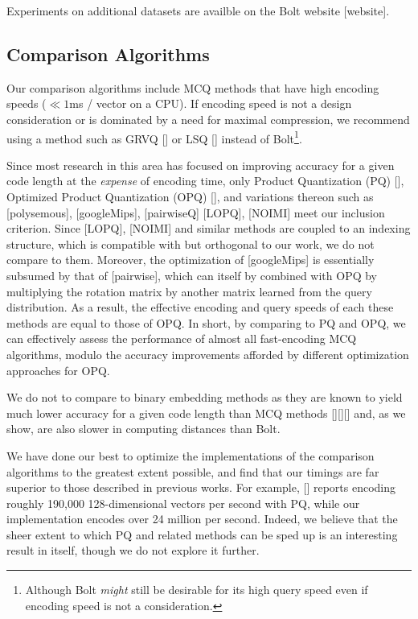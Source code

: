 Experiments on additional datasets are availble on the Bolt website [website].

\subsection{Comparison Algorithms}

Our comparison algorithms include MCQ methods that have high encoding speeds ($\ll 1$ms / vector on a CPU). If encoding speed is not a design consideration or is dominated by a need for maximal compression, we recommend using a method such as GRVQ [] or LSQ [] instead of Bolt\footnote{Although Bolt \textit{might} still be desirable for its high query speed even if encoding speed is not a consideration.}.

Since most research in this area has focused on improving accuracy for a given code length at the \textit{expense} of encoding time, only Product Quantization (PQ) [], Optimized Product Quantization (OPQ) [], and variations thereon such as [polysemous], [googleMips], [pairwiseQ] [LOPQ], [NOIMI] meet our inclusion criterion. Since [LOPQ], [NOIMI] and similar methods are coupled to an indexing structure, which is compatible with but orthogonal to our work, we do not compare to them. Moreover, the optimization of [googleMips] is essentially subsumed by that of [pairwise], which can itself by combined with OPQ by multiplying the rotation matrix by another matrix learned from the query distribution. As a result, the effective encoding and query speeds of each these methods are equal to those of OPQ. In short, by comparing to PQ and OPQ, we can effectively assess the performance of almost all fast-encoding MCQ algorithms, modulo the accuracy improvements afforded by different optimization approaches for OPQ.

We do not to compare to binary embedding methods as they are known to yield much lower accuracy for a given code length than MCQ methods [][][] and, as we show, are also slower in computing distances than Bolt. %

We have done our best to optimize the implementations of the comparison algorithms to the greatest extent possible, and find that our timings are far superior to those described in previous works. For example, [] reports encoding roughly 190,000 128-dimensional vectors per second with PQ, while our implementation encodes over 24 million per second. Indeed, we believe that the sheer extent to which PQ and related methods can be sped up is an interesting result in itself, though we do not explore it further.

